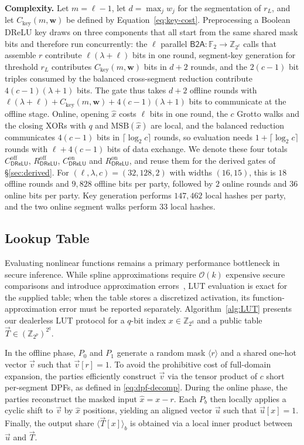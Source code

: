 \documentclass[journal]{IEEEtran}
\theoremstyle{definition}
\theoremstyle{plain}
\newcommand{\Z}{\mathbb{Z}}
\newcommand{\F}{\mathbb{F}}
\newcommand{\ashare}[1]{\langle #1 \rangle}             %
\newcommand{\DReLU}{\mathsf{DReLU}}
\newcommand{\nseg}{c}                              %
\newcommand{\wseg}{w}                              %
\begin{document}
\textbf{Complexity.} Let $m=\ell-1$, let $d=\max_j\wseg_j$ for the
segmentation of $r_L$, and let $C_{\mathrm{key}}(m,\boldsymbol{\wseg})$ be
defined by Equation~\eqref{eq:key-cost}. Preprocessing a Boolean DReLU key
draws on three components that all start from the same shared mask bits and
therefore run concurrently: the $\ell$ parallel
$\mathsf{B2A}:\F_2\rightarrow\Z_{2^\ell}$ calls that assemble $r$ contribute
$\ell(\lambda+\ell)$ bits in one round, segment-key generation for threshold
$r_L$ contributes $C_{\mathrm{key}}(m,\boldsymbol{\wseg})$ bits in $d+2$
rounds, and the $2(\nseg-1)$ bit triples consumed by the balanced
cross-segment reduction contribute $4(\nseg-1)(\lambda+1)$ bits. The gate thus
takes $d+2$ offline rounds with
$\ell(\lambda+\ell)+C_{\mathrm{key}}(m,\boldsymbol{\wseg})+4(\nseg-1)(\lambda+1)$
bits to communicate at the offline stage. Online, opening $\hat{x}$ costs
$\ell$ bits in one round, the $\nseg$ Grotto walks and the closing XORs with
$q$ and $\mathrm{MSB}(\hat{x})$ are local, and the balanced reduction
communicates $4(\nseg-1)$ bits in $\lceil\log_2\nseg\rceil$ rounds, so
evaluation needs $1+\lceil\log_2\nseg\rceil$ rounds with $\ell+4(\nseg-1)$
bits of data exchange. We denote these four totals
$C^{\mathrm{off}}_{\DReLU}$, $R^{\mathrm{off}}_{\DReLU}$,
$C^{\mathrm{on}}_{\DReLU}$ and $R^{\mathrm{on}}_{\DReLU}$, and reuse them for
the derived gates of \S\ref{sec:derived}. For
$(\ell,\lambda,\nseg)=(32,128,2)$ with widths $(16,15)$, this is $18$ offline
rounds and $9{,}828$ offline bits per party, followed by $2$ online rounds and
$36$ online bits per party. Key generation performs $147{,}462$ local hashes
per party, and the two online segment walks perform $33$ local hashes.


\subsection{Lookup Table}\label{sec:lut}
Evaluating nonlinear functions remains a primary performance bottleneck in
secure inference. While spline approximations require 
$\mathcal{O}(k)$ expensive secure comparisons 
and introduce approximation errors~\cite{pika}, 
LUT evaluation is exact for the supplied table; when the table stores a
discretized activation, its function-approximation error must be reported
separately.
Algorithm~\ref{alg:LUT} presents our dealerless LUT
protocol for a $q$-bit index $x\in\Z_{2^q}$ and a public table
$\vec T\in(\Z_{2^p})^{2^q}$.

In the offline phase, $P_0$ and $P_1$ generate 
a random mask $\ashare{r}$ and a shared one-hot 
vector $\vec{v}$ such that $\vec{v}[r]=1$. To avoid the 
prohibitive cost of full-domain expansion, 
the parties efficiently construct $\vec{v}$ via 
the tensor product of $\nseg$ short per-segment DPFs, 
as defined in \eqref{eq:dpf-decomp}. During the online phase, 
the parties reconstruct the masked input $\hat{x} = x - r$. Each $P_b$ 
then locally applies a cyclic shift to $\vec{v}$ by $\hat{x}$ positions, 
yielding an aligned vector $\vec{u}$ such that $\vec{u}[x]=1$. 
Finally, the output share $\ashare{\vec{T}[x]}_b$ is obtained via a 
local inner product between $\vec{u}$ and $\vec{T}$.
\end{document}

